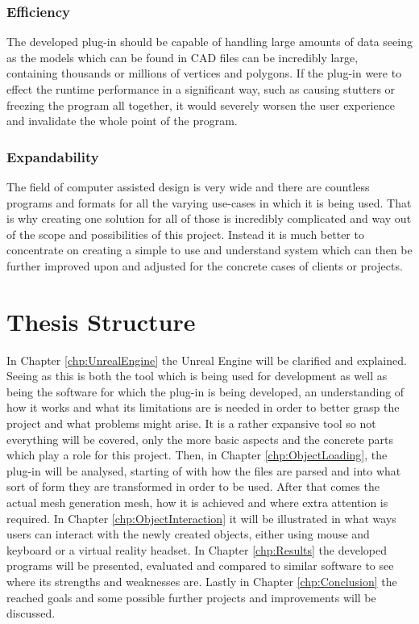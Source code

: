 \subsubsection{Efficiency} 
The developed plug-in should be capable of handling large amounts of data seeing as the models which can be found in CAD files can be incredibly large, containing thousands or millions of vertices and polygons. If the plug-in were to effect the runtime performance in a significant way, such as causing stutters or freezing the program all together, it would severely worsen the user experience and invalidate the whole point of the program.

\subsubsection{Expandability} 
The field of computer assisted design is very wide and there are countless programs and formats for all the varying use-cases in which it is being used. That is why creating one solution for all of those is incredibly complicated and way out of the scope and possibilities of this project. Instead it is much better to concentrate on creating a simple to use and understand system which can then be further improved upon and adjusted for the concrete cases of clients or projects.

\section{Thesis Structure}
In Chapter \ref{chp:UnrealEngine} the Unreal Engine will be clarified and explained. Seeing as this is both the tool which is being used for development as well as being the software for which the plug-in is being developed, an understanding of how it works and what its limitations are is needed in order to better grasp the project and what problems might arise. It is a rather expansive tool so not everything will be covered, only the more basic aspects and the concrete parts which play a role for this project. Then, in Chapter \ref{chp:ObjectLoading}, the plug-in will be analysed, starting of with how the files are parsed and into what sort of form they are transformed in order to be used. After that comes the actual mesh generation mesh, how it is achieved and where  extra attention is required. In Chapter \ref{chp:ObjectInteraction} it will be illustrated in what ways users can interact with the newly created objects, either using mouse and keyboard or a virtual reality headset. In Chapter \ref{chp:Results} the developed programs will be presented, evaluated and compared to similar software to see where its strengths and weaknesses are. Lastly in Chapter \ref{chp:Conclusion} the reached goals and some possible further projects and improvements will be discussed.


